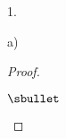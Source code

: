 \documentclass[11pt]{article}%
\begin{document}
\begin{noliste}{1.}
\begin{noliste}{a)}
\begin{proof}
\begin{remarkL}{.98}
\begin{noliste}{$\sbullet$}
        \end{noliste}
      \end{remarkL}


      \newpage
      

\end{proof}
\end{noliste}
\end{noliste}
\end{document}
